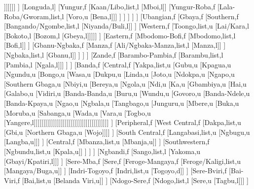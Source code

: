 \documentclass[landscape]{standalone}
\begin{document}
\begin{forest}
									]]]]]]
								]
								[Longuda,l]
								[Yungur,f
									[Kaan/Libo,list,l
									[Mboi,l]]
									[Yungur-Roba,f
										[Lala-Roba/Gworam,list,l
										[Voro,u
										[Bena,l]]]
									]
								]
							]
						]
					]
					[Ubangian,f
						[Gbaya,f
							[Southern,f
								[Bangando/Ngombe,list,l
								[Niyanda/Buli,l]]
							]
							[Western,f
								[Toongo,list,u
								[Lai/Kara,l
								[Bokoto,l
								[Bozom,l
								[Gbeya,l]]]]]
							]
							[Eastern,f
								[Mbodomo-Bofi,f
									[Mbodomo,list,l
									[Bofi,l]]
								]
								[Gbanu-Ngbaka,f
									[Manza,f
										[Ali/Ngbaka-Manza,list,l
										[Manza,l]]
									]
									[Ngbaka,list,l
									[Gbanu,l]]
								]
							]
						]
						[Zande,f
							[Barambo-Pambia,f
								[Barambu,list,l
								[Pambia,l
								[Ngala,l]]]
							]
						]
						[Banda,f
							[Central,f
								[Yakpa,list,u
								[Gubu,u
								[Kpagua,u
								[Ngundu,u
								[Bongo,u
								[Wasa,u
								[Dukpu,u
								[Linda,u
								[Joto,u
								[Ndokpa,u
								[Ngapo,u
								[Southern Gbaga,u
								[Nbiyi,u
								[Bereya,u
								[Ngola,u
								[Ndi,u
								[Ka,u
								[Gbambiya,u
								[Hai,u
								[Galabo,u
								[Vidiri,u
								[Banda-Banda,u
								[Buru,u
								[Wundu,u
								[Govoro,u
								[Banda-Ndele,u
								[Banda-Kpaya,u
								[Ngao,u
								[Ngbala,u
								[Tangbago,u
								[Junguru,u
								[Mbere,u
								[Buka,u
								[Moruba,u
								[Sabanga,u
								[Wada,u
								[Vara,u
								[Togbo,u
								[Yangere,l]]]]]]]]]]]]]]]]]]]]]]]]]]]]]]]]]]]]]]]
							]
							[Peripheral,f
								[West Central,f
									[Dakpa,list,u
									[Gbi,u
									[Northern Gbaga,u
									[Wojo]]]]
								]
								[South Central,f
									[Langabasi,list,u
									[Ngbugu,u
									[Langba,u]]]
								]
								[Central,f
									[Mbanza,list,u
									[Mbanja,u]]
								]
								[Southwestern,f
									[Ngbundu,list,u
									[Kpala,u]]
								]
							]
						]
						[Ngbandi,f
							[Sango,list,l
							[Yakoma,u
							[Gbayi/Kpatiri,l]]]
						]
						[Sere-Mba,f
							[Sere,f
								[Feroge-Mangaya,f
									[Feroge/Kaligi,list,u
									[Mangaya/Buga,u]]
								]
								[Indri-Togoyo,f
									[Indri,list,u
									[Togoyo,d]]
								]
								[Sere-Bviri,f
									[Bai-Viri,f
										[Bai,list,u
										[Belanda Viri,u]]
									]
									[Ndogo-Sere,f
										[Ndogo,list,l
										[Sere,u
										[Tagbu,l]]]
									]

\end{forest}
\end{document}
